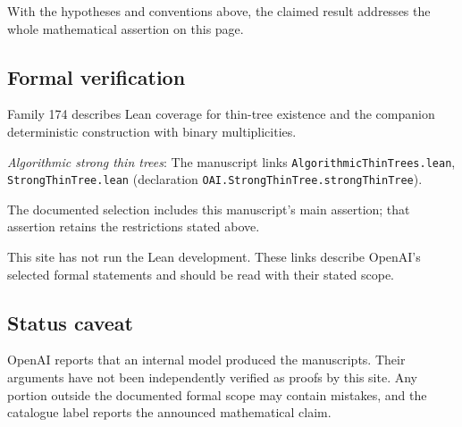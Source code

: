 \documentclass[11pt]{article}
\begin{document}
With the hypotheses and conventions above, the claimed result addresses the whole mathematical assertion on this page.

\subsection{Formal verification}
Family 174 describes Lean coverage for thin-tree existence and the companion deterministic construction with binary multiplicities.

\textit{Algorithmic strong thin trees}: The manuscript links \texttt{AlgorithmicThinTrees.lean}, \texttt{StrongThinTree.lean} (declaration \texttt{OAI.StrongThinTree.strongThinTree}).

The documented selection includes this manuscript’s main assertion; that assertion retains the restrictions stated above.

This site has not run the Lean development. These links describe OpenAI’s selected formal statements and should be read with their stated scope.

\subsection{Status caveat}
OpenAI reports that an internal model produced the manuscripts. Their arguments have not been independently verified as proofs by this site. Any portion outside the documented formal scope may contain mistakes, and the catalogue label reports the announced mathematical claim.
\end{document}
